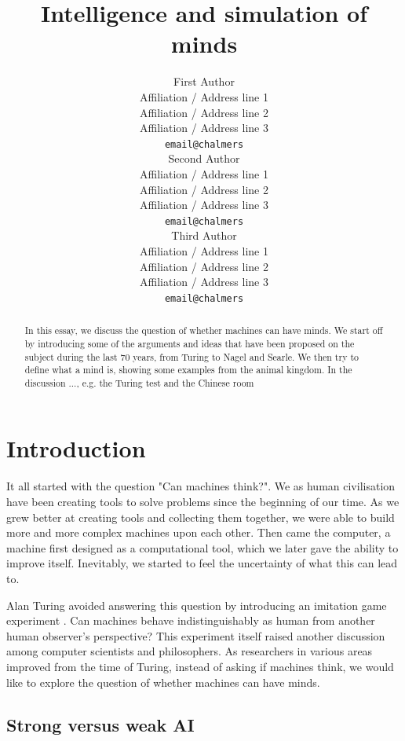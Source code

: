 \documentclass[11pt]{article}
\title{Intelligence and simulation of minds}
\author{First Author \\
  Affiliation / Address line 1 \\
  Affiliation / Address line 2 \\
  Affiliation / Address line 3 \\
  {\tt email@chalmers} \\\And
  Second Author \\
  Affiliation / Address line 1 \\
  Affiliation / Address line 2 \\
  Affiliation / Address line 3 \\
  {\tt email@chalmers} \\\And
  Third Author \\
  Affiliation / Address line 1 \\
  Affiliation / Address line 2 \\
  Affiliation / Address line 3 \\
  {\tt email@chalmers} \\}
\date{}
\newcommand{\sk}[1]{{\color{dark-green-2} #1}}
\newcommand{\dr}[1]{{\color{dark-cornflower-blue-2} #1}}
\newenvironment{sketch}{\color{dark-green-2}}{\ignorespacesafterend}
\newenvironment{draft}{\color{dark-cornflower-blue-2}}{\ignorespacesafterend}
\begin{document}
\maketitle
\begin{abstract}
\sk{
In this essay, we discuss the question of whether machines can have minds. We start off by introducing some of the arguments and ideas that have been proposed on the subject during the last 70 years, from Turing to Nagel and Searle. We then try to define what a mind is, showing some examples from the animal kingdom. In the discussion ..., e.g. the Turing test and the Chinese room \todo{Bjorn, finish this}
}
\end{abstract}

\section{Introduction}
\label{sec:introduction}

It all started with the question "Can machines think?". We as human civilisation have been creating tools to solve problems since the beginning of our time. As we grew better at creating tools and collecting them together, we were able to build more and more complex machines upon each other. Then came the computer, a machine first designed as a computational tool, which we later gave the ability to improve itself. Inevitably, we started to feel the uncertainty of what this can lead to.

Alan Turing avoided answering this question by introducing an imitation game experiment \cite{turing1950computing}. Can machines behave indistinguishably as human from another human observer's perspective? This experiment itself raised another discussion among computer scientists and philosophers. As researchers in various areas improved from the time of Turing, instead of asking if machines think, we would like to explore the question of whether machines can have minds.


%
%
%


\subsection{Strong versus weak AI}
\end{document}
